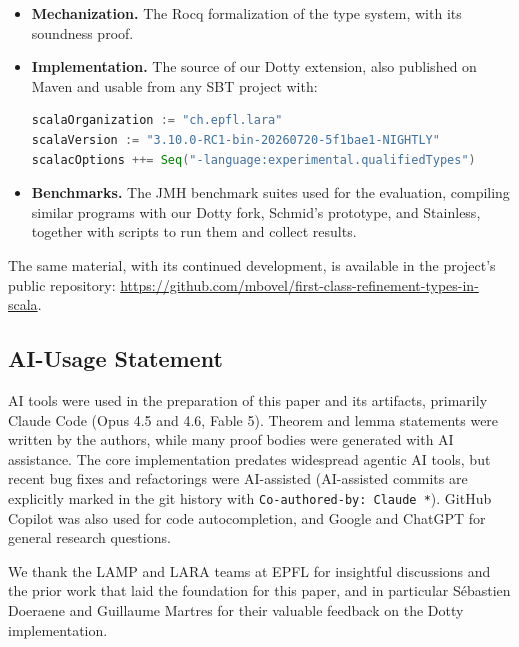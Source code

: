 \documentclass[acmsmall]{acmart}
\begin{document}
\begin{itemize}
  \item \textbf{Mechanization.} The Rocq formalization of the type system, with its soundness proof.
  \item \textbf{Implementation.} The source of our Dotty extension, also published on Maven and usable from any SBT project with:
\begin{lstlisting}[language=Scala]
scalaOrganization := "ch.epfl.lara"
scalaVersion := "3.10.0-RC1-bin-20260720-5f1bae1-NIGHTLY"
scalacOptions ++= Seq("-language:experimental.qualifiedTypes")
\end{lstlisting}
  \item \textbf{Benchmarks.} The JMH benchmark suites used for the evaluation, compiling similar programs with our Dotty fork, Schmid's prototype, and Stainless, together with scripts to run them and collect results.
\end{itemize}

The same material, with its continued development, is available in the project's public repository: \url{https://github.com/mbovel/first-class-refinement-types-in-scala}.

\subsection*{AI-Usage Statement}

AI tools were used in the preparation of this paper and its artifacts, primarily Claude Code (Opus 4.5 and 4.6, Fable 5). Theorem and lemma statements were written by the authors, while many proof bodies were generated with AI assistance. The core implementation predates widespread agentic AI tools, but recent bug fixes and refactorings were AI-assisted (AI-assisted commits are explicitly marked in the git history with \texttt{Co-authored-by: Claude *}). GitHub Copilot was also used for code autocompletion, and Google and ChatGPT for general research questions.

\begin{acks}

We thank the LAMP and LARA teams at EPFL for insightful discussions and the prior work that laid the foundation for this paper, and in particular Sébastien Doeraene and Guillaume Martres for their valuable feedback on the Dotty implementation.

\end{acks}
\end{document}

